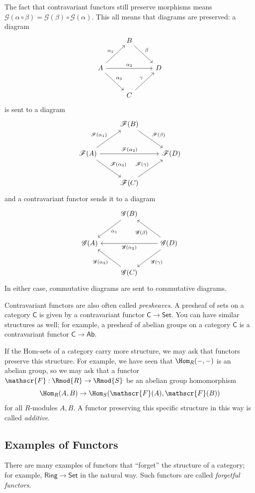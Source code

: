 The fact that contravariant functors still preserve morphisms means $\mathscr{G} (\alpha \circ \beta )=\mathscr{G} (\beta )\circ \mathscr{G} (\alpha )$. This all means that diagrams are preserved: a diagram
\[\begin{tikzcd}[row sep = 2.5em, column sep = 2.5em]
	&B\arrow[dr, "\beta "]\\
	A\arrow[ur, "\alpha_1"]\arrow[rr, "\alpha _2"]\arrow[dr, "\alpha _3"]&&D\\
									    &C\arrow[ur, "\gamma "]
\end{tikzcd}\]
is sent to a diagram
\[\begin{tikzcd}[row sep = 2.5em, column sep = 2.5em]
	&\mathscr{F} (B)\arrow[dr, "\mathscr{F} (\beta )"]\\
	\mathscr{F} (A)\arrow[ur, "\mathscr{F} (\alpha_1)"]\arrow[rr, "\mathscr{F} (\alpha _2)"]\arrow[dr, "\mathscr{F} (\alpha _3)"]&&\mathscr{F} (D)\\
									    &\mathscr{F} (C)\arrow[ur, "\mathscr{F} (\gamma )"]
\end{tikzcd}\]
and a contravariant functor sends it to a diagram
\[\begin{tikzcd}[row sep = 2.5em, column sep = 2.5em]
	&\mathscr{G} (B)\arrow[dl, "\alpha _1"]\\
	\mathscr{G} (A)&&\mathscr{G} (D)\arrow[ll, "\mathscr{G} (\alpha _2)"]\arrow[ul, "\mathscr{G} (\beta )"]\arrow[dl, "\mathscr{G} (\gamma )"]\\
		       &\mathscr{G} (C)\arrow[ul, "\mathscr{G} (\alpha_3)"]
\end{tikzcd}\]
In either case, commutative diagrams are sent to commutative diagrams.

Contravariant functors are also often called \emph{presheaves}. A presheaf of sets on a category $\mathsf{C} $ is given by a contravariant functor $\mathsf{C}  \to \mathsf{Set} $. You can have similar structures as well; for example, a presheaf of abelian groups on a category $\mathsf{C} $ is a contravariant functor $\mathsf{C}  \to \mathsf{Ab} $.

If the Hom-sets of a category carry more structure, we may ask that functors preserve this structure. For example, we have seen that $\Hom_{R}(-, -) $ is an abelian group, so we may ask that a functor $\mathscr{F} : \Rmod{R}  \to \Rmod{S} $ be an abelian group homomorphism
\[
	\Hom_{R}(A, B) \to \Hom_{S}(\mathscr{F} (A), \mathscr{F} (B)) 
\]
for all $R$-modules $A,B$. A functor preserving this specific structure in this way is called \emph{additive}.
\subsection{Examples of Functors}
There are many examples of functors that ``forget'' the structure of a category; for example, $\mathsf{Ring} \to \mathsf{Set} $ in the natural way. Such functors are called \emph{forgetful functors}.

